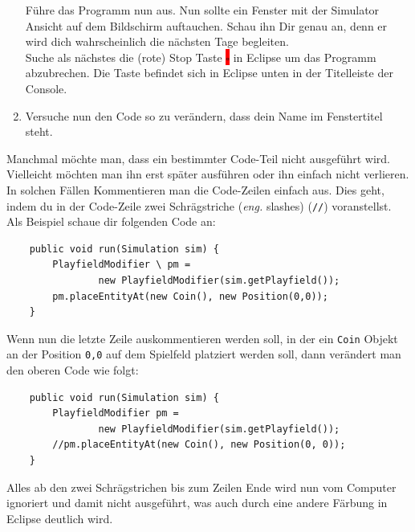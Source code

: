\begin{enumerate}
    Führe das Programm nun aus. Nun sollte ein Fenster mit der Simulator Ansicht auf dem Bildschirm auftauchen. Schau ihn Dir genau an, denn er wird dich wahrscheinlich die nächsten Tage begleiten.\\
    Suche als nächstes die (rote) Stop Taste \colorbox{red}{$\square$} in Eclipse um das Programm abzubrechen. Die Taste befindet sich in Eclipse unten in der Titelleiste der Console.
    \item Versuche nun den Code so zu verändern, dass dein Name im Fenstertitel steht.
\end{enumerate}


\begin{Infobox}
    Manchmal möchte man, dass ein bestimmter Code-Teil nicht ausgeführt wird.
    Vielleicht möchten man ihn erst später ausführen oder ihn einfach nicht verlieren.
    In solchen Fällen Kommentieren man die Code-Zeilen einfach aus.
    Dies geht, indem du in der Code-Zeile zwei Schrägstriche (\emph{eng.} slashes) (\lstinline{//}) voranstellst.\\
    Als Beispiel schaue dir folgenden Code an:\\

    \hfill
    \begin{minipage}{0.96\textwidth}
        \begin{lstlisting}
    public void run(Simulation sim) {
        PlayfieldModifier \ pm =
                new PlayfieldModifier(sim.getPlayfield());
        pm.placeEntityAt(new Coin(), new Position(0,0));
    }
        \end{lstlisting}
    \end{minipage}

    Wenn nun die letzte Zeile auskommentieren werden soll, in der ein \lstinline{Coin} Objekt an der Position \lstinline{0,0} auf dem Spielfeld platziert werden soll, dann verändert man den oberen Code wie folgt:\\

    \hfill
    \begin{minipage}{.96\textwidth}
        \begin{lstlisting}
    public void run(Simulation sim) {
        PlayfieldModifier pm =
                new PlayfieldModifier(sim.getPlayfield());
        //pm.placeEntityAt(new Coin(), new Position(0, 0));
    }
        \end{lstlisting}
    \end{minipage}

    Alles ab den zwei Schrägstrichen bis zum Zeilen Ende wird nun vom Computer ignoriert und damit nicht ausgeführt, was auch durch eine andere Färbung in Eclipse deutlich wird.
\end{Infobox}


